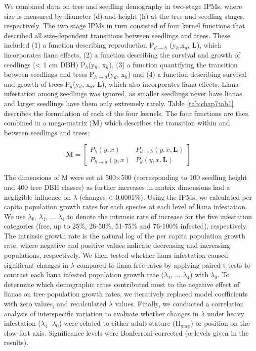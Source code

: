 \documentclass[b5paper,justified]{tufte-book} %
\begin{document}
\begin{fullwidth}
We combined data on tree and seedling demography in two-stage IPMs, where size is measured by diameter (d) and height (h) at the tree and seedling stages, respectively. The two stage IPMs in turn consisted of four kernel functions that described all size-dependent transitions between seedlings and trees. These included (1) a function describing reproduction P$_{d\rightarrow h}$ (y$_h$,x$_d$, \textbf{L}), which incorporates liana effects, (2) a function describing the survival and growth of seedlings (< 1 cm DBH) P$_h$(y$_h$, x$_h$), (3) a function quantifying the transition between seedlings and trees P$_{h\rightarrow d}$(y$_d$, x$_h$) and (4) a function describing survival and growth of trees P$_d$(y$_d$, x$_d$, \textbf{L}), which also incorporates liana effects. Liana infestation among seedlings was ignored, as smaller seedlings never have lianas and larger seedlings have them only extremely rarely. Table \ref{tab:chap7tab1} describes the formulation of each of the four kernels. The four functions are then combined in a mega-matrix (\textbf{M}) which describes the transition within and between seedlings and trees: 

\begin{equation}
\textbf{M}=
  \begin{bmatrix}
P_h (y,x) & P_{d\rightarrow h} (y,x,\textbf{L}) \\ 
P_{h\rightarrow d} (y,x) & P_d (y,x,\textbf{L})
  \end{bmatrix}
\label{eq:chap7eq4}
\end{equation}

The dimensions of M were set at 500$\times$500 (corresponding to 100 seedling height and 400 tree DBH classes) as further increases in matrix dimensions had a negligible influence on $\lambda$ (changes < 0.0001\%). 
Using the IPMs, we calculated per capita population growth rates for each species at each level of liana infestation. We use $\lambda_0$, $\lambda_1$, ... $\lambda_4$ to denote the intrinsic rate of increase for the five infestation categories (free, up to 25\%, 26-50\%, 51-75\% and 76-100\% infested), respectively. The intrinsic growth rate is the natural log of the per capita population growth rate, where negative and positive values indicate decreasing and increasing populations, respectively. We then tested whether liana infestation caused significant changes in $\lambda$ compared to liana free rates by applying paired t-tests to contrast each liana infested population growth rate ($\lambda_1$, ... $\lambda_4$) with $\lambda_0$. To determine which demographic rates contributed most to the negative effect of lianas on tree population growth rates, we iteratively replaced model coefficients with zero values, and recalculated $\lambda$ values.  Finally, we conducted a correlation analysis of interspecific variation to evaluate whether changes in $\lambda$ under heavy infestation ($\lambda_4$- $\lambda_0$) were related to either adult stature (H$_{max}$) or position on the slow-fast axis. Significance levels were Bonferroni-corrected ($\alpha$-levels given in the results). 


\end{fullwidth}
\end{document}
